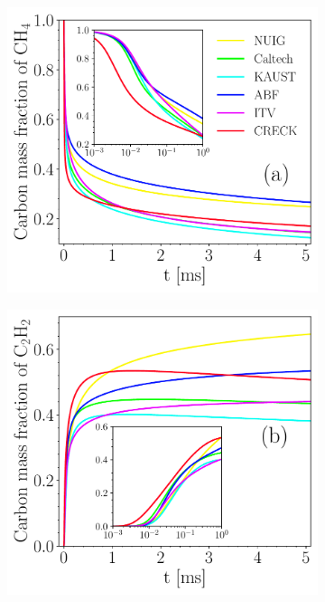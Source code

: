 \begin{figure}[H]
	\centering
	\begin{subfigure}[t]{0.31\textwidth}
		\includegraphics[width=1\textwidth]{Figures/Results/chemistry/CH4.pdf}
	\end{subfigure}
	\begin{subfigure}[t]{0.31\textwidth}
		\includegraphics[width=1\textwidth]{Figures/Results/chemistry/C2H2.pdf}

\end{subfigure}
\end{figure}

